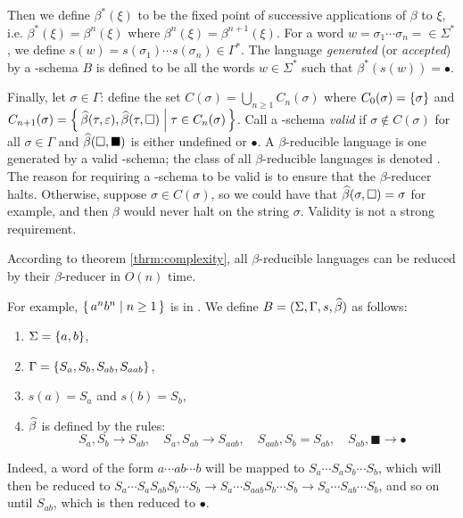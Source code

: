 \documentclass{llncs}
\begin{document}
Then we define $\beta^*(\xi)$ to be the fixed point of successive applications of $\beta$ to $\xi$, i.e. $\beta^*(\xi)=\beta^n(\xi)$ where $\beta^n(\xi)=\beta^{n+1}(\xi)$.
For a word $w=\sigma_1\cdots\sigma_n=\in\Sigma^*$, we define $s(w)=s(\sigma_1)\cdots s(\sigma_n)\in\Gamma^*$.
The language \textit{generated} (or \textit{accepted}) by a \BR-schema $B$ is defined to be all the words $w\in\Sigma^*$ such that $\beta^*(s(w))=\bullet$.

Finally, let $\sigma\in\Gamma$: define the set $C(\sigma)=\bigcup_{n\geq1}C_n(\sigma)$ where $C_0(\sigma)=\set\sigma$ and $C_{n+1}(\sigma)=\set{\hb(\tau,\epsilon),\hb(\tau,\square)}[\tau\in C_n(\sigma)]$.
Call a \BR-schema \textit{valid} if $\sigma\notin C(\sigma)$ for all $\sigma\in\Gamma$ and $\widehat\beta(\square,\blacksquare)$ is either undefined or $\bullet$.
A $\beta$-reducible language is one generated by a valid \BR-schema; the class of all $\beta$-reducible languages is denoted \BR.
The reason for requiring a \BR-schema to be valid is to ensure that the $\beta$-reducer halts.
Otherwise, suppose $\sigma\in C(\sigma)$, so we could have that $\widehat\beta(\sigma,\square)=\sigma$ for example, and then $\beta$ would never halt on the string $\sigma$.
Validity is not a strong requirement.

According to theorem \ref{thrm:complexity}, all $\beta$-reducible languages can be reduced by their $\beta$-reducer in $O(n)$ time.

For example, $\set{a^nb^n}[n\geq1]$ is in \BR.
We define $B=(\Sigma,\Gamma,s,\widehat\beta)$ as follows:
\begin{enumerate}
    \item $\Sigma=\set{a,b}$,
    \item $\Gamma=\set{S_a,S_b,S_{ab},S_{aab}}$,
    \item $s(a)=S_a$ and $s(b)=S_b$,
    \item $\widehat\beta$ is defined by the rules:
        \[ S_a,S_b\to S_{ab},\quad S_a,S_{ab}\to S_{aab},\quad S_{aab},S_b=S_{ab},\quad S_{ab},\blacksquare\to\bullet \]
\end{enumerate}
Indeed, a word of the form $a\cdots ab\cdots b$ will be mapped to $S_a\cdots S_aS_b\cdots S_b$, which will then be reduced to $S_a\cdots S_aS_{ab}S_b\cdots S_b\to S_a\cdots S_{aab}S_b\cdots S_b\to S_a\cdots S_{ab}\cdots S_b$, and so on until $S_{ab}$, which is then reduced
to $\bullet$.
\end{document}
